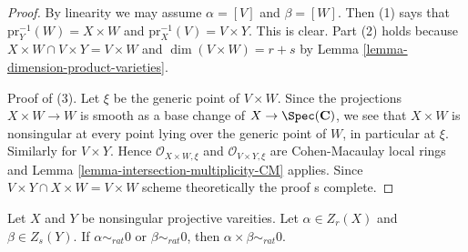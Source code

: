 \begin{proof}
By linearity we may assume $\alpha = [V]$ and $\beta = [W]$.
Then (1) says that $\text{pr}_Y^{-1}(W) = X \times W$ and
$\text{pr}_X^{-1}(V) = V \times Y$. This is clear.
Part (2) holds because $X \times W \cap V \times Y = V \times W$ and
$\dim(V \times W) = r + s$ by Lemma \ref{lemma-dimension-product-varieties}.

\medskip\noindent
Proof of (3).
Let $\xi$ be the generic point of $V \times W$.
Since the projections $X \times W \to W$ is smooth as a base change of
$X \to \Spec(\mathbf{C})$, we see that $X \times W$ is nonsingular
at every point lying over the generic point of $W$, in particular at $\xi$.
Similarly for $V \times Y$. Hence $\mathcal{O}_{X \times W, \xi}$
and $\mathcal{O}_{V \times Y, \xi}$ are Cohen-Macaulay local rings
and Lemma \ref{lemma-intersection-multiplicity-CM} applies.
Since $V \times Y \cap X \times W = V \times W$ scheme theoretically
the proof s complete.
\end{proof}

\begin{lemma}
\label{lemma-exterior-product-rational-equivalence}
Let $X$ and $Y$ be nonsingular projective vareities.
Let $\alpha \in Z_r(X)$ and $\beta \in Z_s(Y)$.
If $\alpha \sim_{rat} 0$ or $\beta \sim_{rat} 0$, then
$\alpha \times \beta \sim_{rat} 0$.
\end{lemma}

